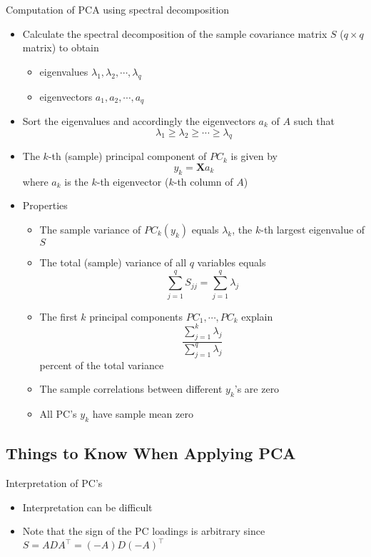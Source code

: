 \documentclass[a4paper]{article}
\begin{document}
Computation of PCA using spectral decomposition
\begin{itemize}
    \item Calculate the spectral decomposition of the sample covariance matrix $S$ ($q\times q$ matrix) to obtain
    \begin{itemize}
        \item eigenvalues $\lambda_1,\lambda_2,\cdots,\lambda_q$
        \item eigenvectors $a_1,a_2,\cdots, a_q$
    \end{itemize}
    \item Sort the eigenvalues and accordingly the eigenvectors $a_k$ of $A$ such that
    \[\lambda_1\geq\lambda_2\geq\cdots\geq\lambda_q \]
    \item The $k$-th (sample) principal component of $PC_k$ is given by 
    \[y_k=\mathbf{X}a_k \]
    where $a_k$ is the $k$-th eigenvector ($k$-th column of $A$)
    \item Properties
    \begin{itemize}
        \item The sample variance of $PC_k(y_k)$ equals $\lambda_k$, the $k$-th largest eigenvalue of $S$
        \item The total (sample) variance of all $q$ variables equals
        \[\sum_{j=1}^{q}S_{jj}=\sum_{j=1}^{q}\lambda_j \]
        \item The first $k$ principal components $PC_1,\cdots,PC_k$ explain
        \[\frac{\sum_{j=1}^{k}\lambda_j}{\sum_{j=1}^{q}\lambda_j} \]
        percent of the total variance
        \item The sample correlations between different $y_k$'s are zero
        \item All PC's $y_k$ have sample mean zero
    \end{itemize}
\end{itemize}

\subsection{Things to Know When Applying PCA}

Interpretation of PC's
\begin{itemize}
    \item Interpretation can be difficult
    \item Note that the sign of the PC loadings is arbitrary since $S=ADA^{\intercal}=(-A)D(-A)^{\intercal}$
\end{itemize}
\end{document}

